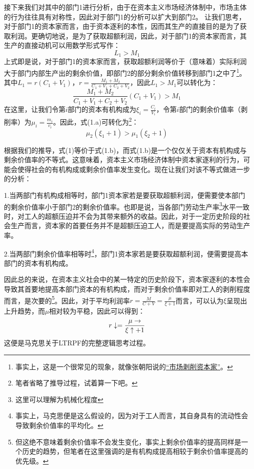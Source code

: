 \documentclass[a4paper,twoside,12pt,AutoFakeBold]{ctexart}
\begin{document}
接下来我们对其中的部门1进行分析，由于在资本主义市场经济体制中，市场主体的行为往往具有对称性，因此对于部门1的分析可以扩大到部门2。
让我们思考，对于部门1的资本家而言，由于资本逐利的本性，因而其生产的直接目的是为了获取利润。更确切地说，是为了获取超额利润，因此，对于部门1的资本家而言，其生产的直接动机可以用数学形式写作：
\begin{equation}
    L_1>M_1\tag{1}
\end{equation}
上式即是说，对于部门1的资本家而言，获取超额利润等价于（意味着）实际利润大于部门内部生产出的剩余价值，即部门2的部分剩余价值转移到部门1之中了\footnote{事实上，这是一个很常见的现象，就像张朝阳说的\href{https://www.bilibili.com/video/BV1ze4y1J7ZA/?spm_id_from=333.337.search-card.all.click&vd_source=33015fad0cdb4da4b0f44b1d5fc3e8bf}{“市场剥削资本家”}。}。
其中$L_1=r(C_1+V_1)$，$r=\frac{M_1+M_2}{C_1+V_1+C_2+V_2}$，因此$L_1>M_1$可以转化为：
\begin{equation}
    \frac{M_1+M_2}{C_1+V_1+C_2+V_2} (C_1+V_1)>M_1\tag{1.a}
\end{equation}
在这里，让我们令第$i$部门的资本有机构成为$\xi_i=\frac{C_i}{V_i}$，令第$i$部门的剩余价值率（剥削率）为$\mu_i = \frac{m_i}{v_i}$。因此，式(1.a)可转化为\footnote{笔者省略了推导过程，试着算一下吧。}：
\begin{equation}
    \mu_2(\xi_1+1)>\mu_1(\xi_2+1)\tag{1.b}
\end{equation}

根据我们的推导，式(1)等价于式(1.b)，而式(1.b)是一个仅仅关于资本有机构成与剩余价值率的不等式。这意味着，资本主义市场经济体制中资本家逐利的行为，可能会使得社会的有机构成或剩余价值率发生变化。现在让我们对该不等式做进一步的分析：

1.当两部门有机构成相等时，部门1资本家若是要获取超额利润，便需要使本部门的剩余价值率小于部门2的剩余价值率。也即是说，当各部门劳动生产率\footnote{这里可以理解为机械化程度}水平一致时，对工人的超额压迫并不会为其带来额外的收益。因此，对于一定历史阶段的社会生产而言，资本家的首要任务并不是超额压迫工人，而是要提高实际的劳动生产率。

2.当两部门剩余价值率相等时\footnote{事实上，马克思便是这么假设的，因为对于工人而言，其自身具有的流动性会导致剩余价值率的平均化。}，部门1资本家若是要获取超额利润，便需要提高本部门的资本有机构成。

因此总的来说，在资本主义社会中的某一特定的历史阶段下，资本家逐利的本性会导致其首要地提高本部门资本的有机构成，而对于剩余价值率即对工人的剥削程度而言，是次要的\footnote{但这绝不意味着剩余价值率不会发生变化，事实上剩余价值率的提高同样是一个历史的趋势，但笔者在这里强调的是有机构成提高相较于剩余价值率提高的优先级。}。因此，对于平均利润率$r = \frac{M}{C+V}=\frac{\mu}{\xi+1}$而言，可以认为$\xi $呈现出上升趋势，而$\mu $相对较为平稳，因此可以得到：
\begin{equation}
    r \downarrow= \frac{\mu\rightarrow}{\xi\uparrow+1}\notag
\end{equation}
这便是马克思关于LTRPF的完整逻辑思考过程。
\end{document}
